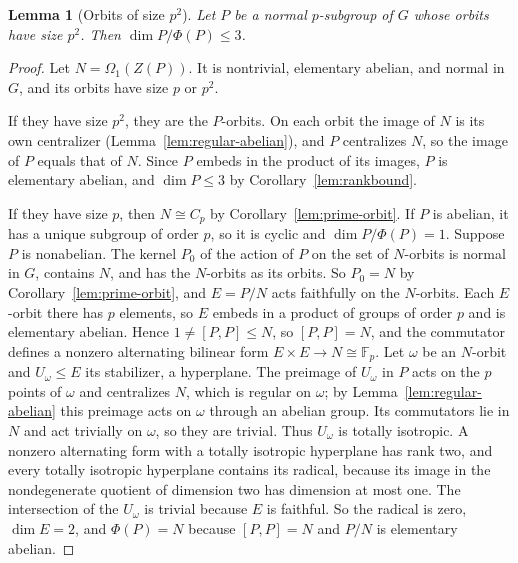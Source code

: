 \documentclass[11pt]{amsart}
\newtheorem{lemma}[theorem]{Lemma}
\theoremstyle{definition}
\theoremstyle{remark}
\newcommand{\F}{\mathbb{F}}
\begin{document}
\begin{lemma}[Orbits of size $p^2$]\label{lem:rank}
Let $P$ be a normal $p$-subgroup of $G$ whose orbits have size $p^2$. Then $\dim P/\Phi(P)\le3$.
\end{lemma}
\begin{proof}
Let $N=\Omega_1(Z(P))$. It is nontrivial, elementary abelian, and normal in $G$, and its orbits have size $p$ or $p^2$.

If they have size $p^2$, they are the $P$-orbits. On each orbit the image of $N$ is its own centralizer (Lemma~\ref{lem:regular-abelian}), and $P$ centralizes $N$, so the image of $P$ equals that of $N$. Since $P$ embeds in the product of its images, $P$ is elementary abelian, and $\dim P\le3$ by Corollary~\ref{lem:rankbound}.

If they have size $p$, then $N\cong C_p$ by Corollary~\ref{lem:prime-orbit}. If $P$ is abelian, it has a unique subgroup of order $p$, so it is cyclic and $\dim P/\Phi(P)=1$. Suppose $P$ is nonabelian. The kernel $P_0$ of the action of $P$ on the set of $N$-orbits is normal in $G$, contains $N$, and has the $N$-orbits as its orbits. So $P_0=N$ by Corollary~\ref{lem:prime-orbit}, and $E=P/N$ acts faithfully on the $N$-orbits. Each $E$-orbit there has $p$ elements, so $E$ embeds in a product of groups of order $p$ and is elementary abelian. Hence $1\ne[P,P]\le N$, so $[P,P]=N$, and the commutator defines a nonzero alternating bilinear form $E\times E\to N\cong\F_p$. Let $\omega$ be an $N$-orbit and $U_\omega\le E$ its stabilizer, a hyperplane. The preimage of $U_\omega$ in $P$ acts on the $p$ points of $\omega$ and centralizes $N$, which is regular on $\omega$; by Lemma~\ref{lem:regular-abelian} this preimage acts on $\omega$ through an abelian group. Its commutators lie in $N$ and act trivially on $\omega$, so they are trivial. Thus $U_\omega$ is totally isotropic. A nonzero alternating form with a totally isotropic hyperplane has rank two, and every totally isotropic hyperplane contains its radical, because its image in the nondegenerate quotient of dimension two has dimension at most one. The intersection of the $U_\omega$ is trivial because $E$ is faithful. So the radical is zero, $\dim E=2$, and $\Phi(P)=N$ because $[P,P]=N$ and $P/N$ is elementary abelian.
\end{proof}
\end{document}
